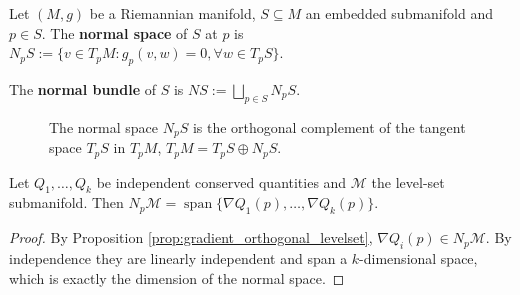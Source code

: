 \begin{definition}\label{def:normal_space}
Let $(M, g)$ be a Riemannian manifold, $S \subseteq M$ an embedded submanifold and $p \in S$. The \textbf{normal space} of $S$ at $p$ is $N_pS := \{v \in T_pM : g_p(v, w) = 0, \forall w \in T_pS\}$.
\end{definition}

\begin{definition}\label{def:normal_bundle}
The \textbf{normal bundle} of $S$ is $NS := \bigsqcup_{p \in S} N_pS$.
\end{definition}

\begin{figure}[htbp]
\centering
{}
\caption{The normal space $N_pS$ is the orthogonal complement of the tangent space $T_pS$ in $T_pM$, $T_pM=T_pS\oplus N_pS$.}
\label{fig:normal_space}
\end{figure}

\begin{proposition}\label{prop:normal_bundle_constraint}
Let $Q_1, \dots, Q_k$ be independent conserved quantities and $\mathcal{M}$ the level-set submanifold. Then $N_p\mathcal{M} = \operatorname{span}\{\nabla Q_1(p), \dots, \nabla Q_k(p)\}$.
\end{proposition}

\begin{proof}
By Proposition \ref{prop:gradient_orthogonal_levelset}, $\nabla Q_i(p) \in N_p\mathcal{M}$. By independence they are linearly independent and span a $k$-dimensional space, which is exactly the dimension of the normal space.
\end{proof}

